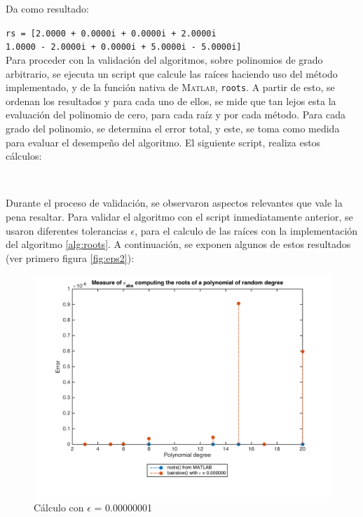 \documentclass[11pt, spanish]{article}
\begin{document}
\begin{itemize}


Da como resultado:

\texttt{rs = [2.0000 + 0.0000i   + 0.0000i   + 2.0000i} \\
\texttt{1.0000 - 2.0000i    + 0.0000i  + 5.0000i  - 5.0000i]}\\

Para proceder con la validación del algoritmos, sobre polinomios de grado arbitrario, se ejecuta un script que calcule las raíces haciendo uso del método implementado, y de la función nativa de \textsc{Matlab}, \texttt{roots}. A partir de esto, se ordenan los resultados y para cada uno de ellos, se mide que tan lejos esta la evaluación del polinomio de cero, para cada raíz y por cada método. Para cada grado del polinomio, se determina el error total, y este, se toma como medida para evaluar el desempeño del algoritmo. El siguiente script, realiza estos cálculos:\\

\newpage

\

\newpage

Durante el proceso de validación, se observaron aspectos relevantes que vale la pena resaltar. Para validar el algoritmo con el script inmediatamente anterior, se usaron diferentes tolerancias $\epsilon$, para el calculo de las raíces con la implementación del algoritmo \ref{alg:roots}. A continuación, se exponen algunos de estos resultados (ver primero figura \ref{fig:eps2}):

\begin{figure}[h]
    \centering
    \includegraphics[width=13cm]{data/img/eps6}
    \caption{Cálculo con $\epsilon$ = 0.00000001}
    \label{fig:eps6}
\end{figure}


\end{itemize}
\end{document}
